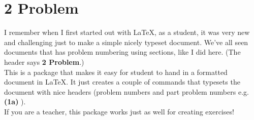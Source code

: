 \section*{2 Problem}
I remember when I first started out with LaTeX, as a student, it was very new and challenging just to make a simple nicely typeset document. We've all seen documents that has problem numbering using sections, like I did here. (The header says \textbf{2 Problem}.)\\

This is a package that makes it easy for student to hand in a formatted document in LaTeX. It just creates a couple of commands that typesets the document with nice headers (problem numbers and part problem numbers e.g. \textbf{(1a)} ).\\

If you are a teacher, this package works just as well for creating exercises!\\
